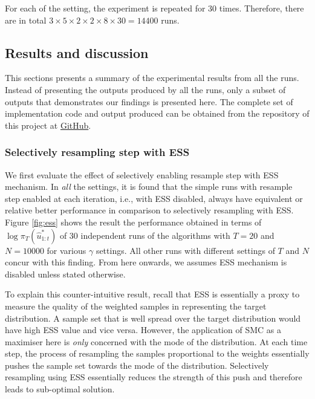 For each of the setting, the experiment is repeated for $30$ times. Therefore, there are in total $3 \times 5 \times 2 \times 2 \times 8 \times 30 = 14400$ runs. 

\subsection{Results and discussion}
This sections presents a summary of the experimental results from all the runs. Instead of presenting the outputs produced by all the runs, only a subset of outputs that demonstrates our findings is presented here. The complete set of implementation code and output produced can be obtained from the repository of this project at \href{https://github.com/yowtzu/mscproj}{GitHub}.

\subsubsection{Selectively resampling step with ESS}
We first evaluate the effect of selectively enabling resample step with ESS mechanism. In \emph{all} the settings, it is found that the simple runs with resample step enabled at each iteration, i.e., with ESS disabled,  always have equivalent or relative better performance in comparison to selectively resampling with ESS. Figure \ref{fig:ess} shows the result the performance obtained in terms of $\log\pi_T(\hat{u}^*_{1:t})$ of 30 independent runs of the algorithms with $T=20$ and $N=10000$ for various $\gamma$ settings. All other runs with different settings of $T$ and $N$ concur with this finding. From here onwards, we assumes ESS mechanism is disabled unless stated otherwise.

To explain this counter-intuitive result, recall that ESS is essentially a proxy to measure the quality of the weighted samples in representing the target distribution. A sample set that is well spread over the target distribution would have high ESS value and vice versa. However, the application of SMC as a maximiser here is \emph{only} concerned with the mode of the distribution. At each time step, the process of resampling the samples proportional to the weights essentially pushes the sample set towards the mode of the distribution. Selectively resampling using ESS essentially reduces the strength of this push and therefore leads to sub-optimal solution.

